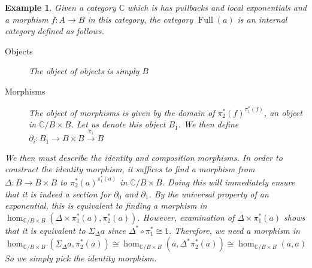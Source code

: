 \documentclass[12pt]{amsart}
\newcommand{\Ccat}{\ensuremath{\mathbb{C}}}
\DeclareMathOperator{\full}{Full}
\newtheorem{example}[thm]{Example}
\begin{document}
\begin{example}
  Given a category $\Ccat$ which is has pullbacks and local
  exponentials and a morphism $f : A \to B$ in this category, the
  category $\full(a)$ is an internal category defined as follows.
  \begin{description}
  \item[Objects] The object of objects is simply $B$
  \item[Morphisms] The object of morphisms is given by the domain of
    $\pi_2^*(f)^{\pi_1^*(f)}$, an object in $\Ccat/B \times B$. Let us
    denote this object $B_1$. We then define
    $\partial_i : B_1 \to B \times B \overset{\pi_i}{\to} B$
  \end{description}
  We then must describe the identity and composition morphisms. In
  order to construct the identity morphism, it suffices to find a
  morphism from $\Delta : B \to B \times B$ to
  $\pi_2^*(a)^{\pi_1^*(a)}$ in $\Ccat/B \times B$. Doing this will
  immediately ensure that it is indeed a section for $\partial_0$ and
  $\partial_1$. By the universal property of an exponential, this is
  equivalent to finding a morphism in
  $\hom_{\Ccat/B \times B}(\Delta \times \pi_1^*(a), \pi_2^*(a))$.
  However, examination of $\Delta \times \pi_1^*(a)$ shows that it is
  equivalent to $\Sigma_\Delta a$ since
  $\Delta^* \circ \pi_1^* \cong 1$. Therefore, we need a morphism in
  \[
    \hom_{\Ccat/B \times B}(\Sigma_\Delta a, \pi_2^*(a)) \cong
    \hom_{\Ccat/B \times B}(a, \Delta^* \pi_2^*(a)) \cong
    \hom_{\Ccat/B \times B}(a, a)
  \]
  So we simply pick the identity morphism.


\end{example}
\end{document}
